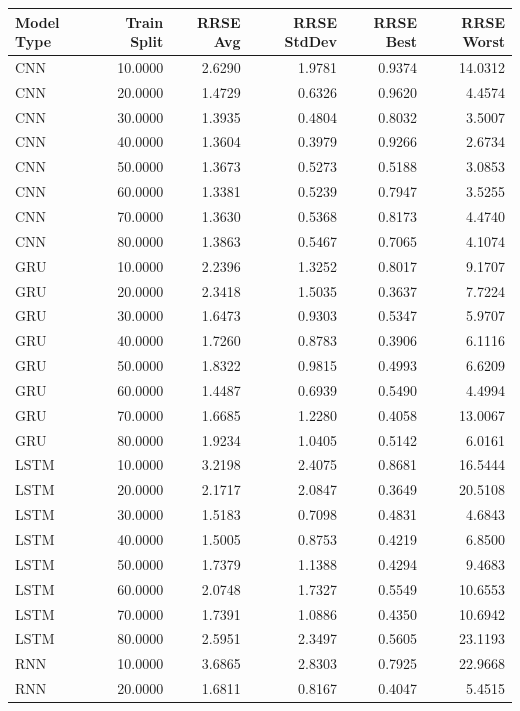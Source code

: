 \begin{tabular}{lrrrrr}
\toprule
Model Type & Train Split & RRSE Avg & RRSE StdDev & RRSE Best & RRSE Worst \\
\midrule
CNN & 10.0000 & 2.6290 & 1.9781 & 0.9374 & 14.0312 \\
CNN & 20.0000 & 1.4729 & 0.6326 & 0.9620 & 4.4574 \\
CNN & 30.0000 & 1.3935 & 0.4804 & 0.8032 & 3.5007 \\
CNN & 40.0000 & 1.3604 & 0.3979 & 0.9266 & 2.6734 \\
CNN & 50.0000 & 1.3673 & 0.5273 & 0.5188 & 3.0853 \\
CNN & 60.0000 & 1.3381 & 0.5239 & 0.7947 & 3.5255 \\
CNN & 70.0000 & 1.3630 & 0.5368 & 0.8173 & 4.4740 \\
CNN & 80.0000 & 1.3863 & 0.5467 & 0.7065 & 4.1074 \\
GRU & 10.0000 & 2.2396 & 1.3252 & 0.8017 & 9.1707 \\
GRU & 20.0000 & 2.3418 & 1.5035 & 0.3637 & 7.7224 \\
GRU & 30.0000 & 1.6473 & 0.9303 & 0.5347 & 5.9707 \\
GRU & 40.0000 & 1.7260 & 0.8783 & 0.3906 & 6.1116 \\
GRU & 50.0000 & 1.8322 & 0.9815 & 0.4993 & 6.6209 \\
GRU & 60.0000 & 1.4487 & 0.6939 & 0.5490 & 4.4994 \\
GRU & 70.0000 & 1.6685 & 1.2280 & 0.4058 & 13.0067 \\
GRU & 80.0000 & 1.9234 & 1.0405 & 0.5142 & 6.0161 \\
LSTM & 10.0000 & 3.2198 & 2.4075 & 0.8681 & 16.5444 \\
LSTM & 20.0000 & 2.1717 & 2.0847 & 0.3649 & 20.5108 \\
LSTM & 30.0000 & 1.5183 & 0.7098 & 0.4831 & 4.6843 \\
LSTM & 40.0000 & 1.5005 & 0.8753 & 0.4219 & 6.8500 \\
LSTM & 50.0000 & 1.7379 & 1.1388 & 0.4294 & 9.4683 \\
LSTM & 60.0000 & 2.0748 & 1.7327 & 0.5549 & 10.6553 \\
LSTM & 70.0000 & 1.7391 & 1.0886 & 0.4350 & 10.6942 \\
LSTM & 80.0000 & 2.5951 & 2.3497 & 0.5605 & 23.1193 \\
RNN & 10.0000 & 3.6865 & 2.8303 & 0.7925 & 22.9668 \\
RNN & 20.0000 & 1.6811 & 0.8167 & 0.4047 & 5.4515 \\

\end{tabular}
